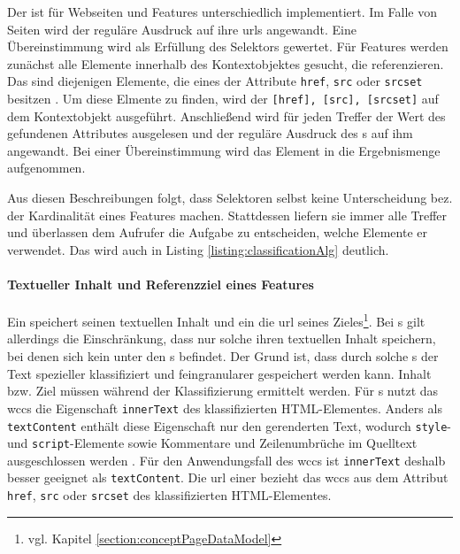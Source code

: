     Der {\urlSelector} ist für Webseiten und Features unterschiedlich implementiert.
    Im Falle von Seiten wird der reguläre Ausdruck auf ihre \glspl{url} angewandt.
    Eine Übereinstimmung wird als Erfüllung des Selektors gewertet.
    Für Features werden zunächst alle Elemente innerhalb des Kontextobjektes gesucht, die {\resources} referenzieren.
    Das sind diejenigen Elemente, die eines der Attribute \texttt{href}, \texttt{src} oder \texttt{srcset} besitzen
    \cite[Kapitel 4.7, 4.8]{w3c:html5}.
    Um diese Elmente zu finden, wird der {\cssSelector} \texttt{[href], [src], [srcset]} auf dem Kontextobjekt ausgeführt.
    Anschließend wird für jeden Treffer der Wert des gefundenen Attributes ausgelesen
    und der reguläre Ausdruck des {\urlSelector}s auf ihm angewandt.
    Bei einer Übereinstimmung wird das Element in die Ergebnismenge aufgenommen.

    Aus diesen Beschreibungen folgt, dass Selektoren selbst keine Unterscheidung bez.
    der Kardinalität eines Features machen.
    Stattdessen liefern sie immer alle Treffer und überlassen dem Aufrufer die Aufgabe zu entscheiden,
    welche Elemente er verwendet.
    Das wird auch in Listing \ref{listing:classificationAlg} deutlich.

    \paragraph{Textueller Inhalt und Referenzziel eines Features}
    Ein {\contentFeature} speichert seinen textuellen Inhalt und ein {}
    die \gls{url} seines Zieles\footnote{vgl. Kapitel \ref{section:conceptPageDataModel}}.
    Bei {\contentFeature}s gilt allerdings die Einschränkung, dass nur solche ihren textuellen Inhalt speichern,
    bei denen sich kein {\contentFeature} unter den {\childFeature}s befindet.
    Der Grund ist, dass durch solche {\childFeature}s der Text spezieller klassifiziert und
    feingranularer gespeichert werden kann.
    Inhalt bzw. Ziel müssen während der Klassifizierung ermittelt werden.
    Für {\contentFeature}s nutzt das \gls{wccs} die Eigenschaft \texttt{innerText} des klassifizierten HTML-Elementes.
    Anders als \texttt{textContent} enthält diese Eigenschaft nur den gerenderten Text,
    wodurch \texttt{style}- und \texttt{script}-Elemente sowie Kommentare und Zeilenumbrüche im Quelltext
    ausgeschlossen werden
    \cite[Kapitel 3.2.7]{whatwg:html}.
    Für den Anwendungsfall des \gls{wccs} ist \texttt{innerText} deshalb besser geeignet als \texttt{textContent}.
    Die \gls{url} einer {\resource} bezieht das \gls{wccs} aus dem Attribut
    \texttt{href}, \texttt{src} oder \texttt{srcset} des klassifizierten HTML-Elementes.


